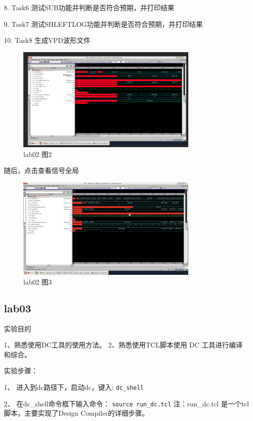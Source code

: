 8. Task6  测试SUB功能并判断是否符合预期，并打印结果

9. Task7  测试SHLEFTLOG功能并判断是否符合预期，并打印结果

10. Task8  生成VPD波形文件

\begin{figure}[H]
    \centering
    \includegraphics[width=0.8\textwidth]{images/lab02-02.png}
    \caption{lab02 图2}
\end{figure}

随后，点击查看信号全局

\begin{figure}[H]
    \centering
    \includegraphics[width=0.8\textwidth]{images/lab02-03.png}
    \caption{lab02 图3}
\end{figure}

\subsection{lab03}

实验目的

1、熟悉使用DC工具的使用方法。
2、熟悉使用TCL脚本使用 DC 工具进行编译和综合。

实验步骤：

1、	进入到dc路径下，启动dc，键入: \texttt{dc\_shell}

2、	在dc\_shell命令框下输入命令： \texttt{source run\_dc.tcl}
注：run\_dc.tcl 是一个tcl脚本，主要实现了Design Compiler的详细步骤。


